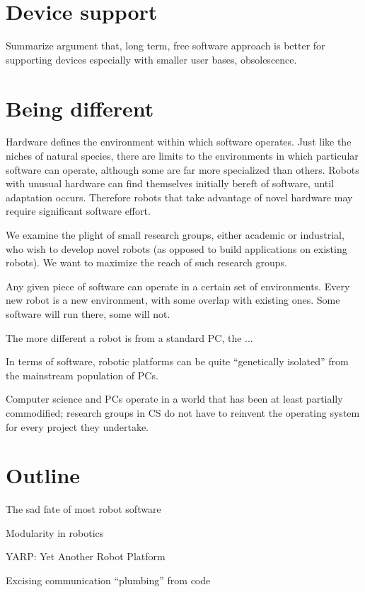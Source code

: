 \section{Device support}

Summarize argument that, long term, free software approach 
is better for supporting devices especially with smaller user
bases, obsolescence.

\section{Being different}


Hardware defines the environment within which software operates.  Just
like the niches of natural species, there are limits to the
environments in which particular software can operate, although some
are far more specialized than others.  Robots with unusual 
hardware can find themselves initially bereft of software,
until adaptation occurs.  Therefore robots that take advantage
of novel hardware may require significant software effort.

We examine the plight of small research groups, either academic or
industrial, who wish to develop novel robots (as opposed to 
build applications on existing robots).  We want to maximize the 
reach of such research groups.

Any given piece of software can operate in a certain set of 
environments.  Every new robot is a new environment, with some
overlap with existing ones.  Some software will run there,
some will not.

The more different a robot is from a standard PC, the ...

In terms of software, robotic platforms can be quite ``genetically
isolated'' from the mainstream population of PCs.  

Computer science and PCs operate in a world that has been at least
partially commodified; research groups in CS do not have to 
reinvent the operating system for every project they undertake.




\section{Outline}

The sad fate of most robot software

Modularity in robotics

YARP: Yet Another Robot Platform

Excising communication ``plumbing'' from code

